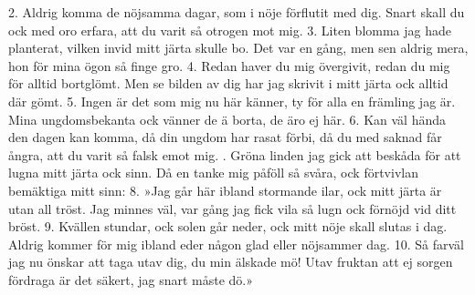 \begin{multicols}{2}
2.  Aldrig komma de nöjsamma dagar,
    som i nöje förflutit med dig.
    Snart skall du ock med oro erfara,
    att du varit så otrogen mot mig.
3.  Liten blomma jag hade planterat,
    vilken invid mitt järta skulle bo.
    Det var en gång, men sen aldrig mera,
    hon för mina ögon så finge gro.
4.  Redan haver du mig övergivit,
    redan du mig för alltid bortglömt.
    Men se bilden av dig har jag skrivit
    i mitt järta ock alltid där gömt.
5.  Ingen är det som mig nu här känner,
    ty för alla en främling jag är.
    Mina ungdomsbekanta ock vänner
    de ä borta, de äro ej här.
6.  Kan väl hända den dagen kan komma,
    då din ungdom har rasat förbi,
    då du med saknad får ångra,
    att du varit så falsk emot mig.
\vfill{}.  Gröna linden jag gick att beskåda
    för att lugna mitt järta ock sinn.
    Då en tanke mig påföll så svåra,
    ock förtvivlan bemäktiga mitt sinn:
8.  »Jag går här ibland stormande ilar,
    ock mitt järta är utan all tröst.
    Jag minnes väl, var gång jag fick vila
    så lugn ock förnöjd vid ditt bröst.
9.  Kvällen stundar, ock solen går neder,
    ock mitt nöje skall slutas i dag.
    Aldrig kommer för mig ibland eder
    någon glad eller nöjsammer dag.
10. Så farväl jag nu önskar att taga
    utav dig, du min älskade mö!
    Utav fruktan att ej sorgen fördraga
    är det säkert, jag snart måste dö.»
\end{multicols}